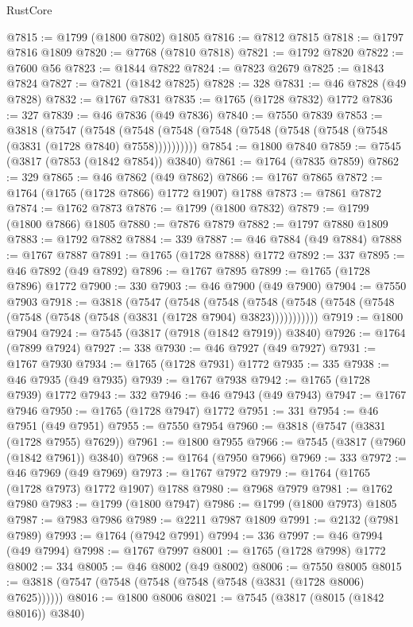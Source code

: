 \begin{lexlean}{RustCore}
\begin{coremodule}
@7815 := @1799 (@1800 @7802) @1805
@7816 := @7812 @7815
@7818 := @1797 @7816 @1809
@7820 := @7768 (@7810 @7818)
@7821 := @1792 @7820
@7822 := @7600 @56
@7823 := @1844 @7822
@7824 := @7823 @2679
@7825 := @1843 @7824
@7827 := @7821 (@1842 @7825)
@7828 := 328
@7831 := @46 @7828 (@49 @7828)
@7832 := @1767 @7831
@7835 := @1765 (@1728 @7832) @1772
@7836 := 327
@7839 := @46 @7836 (@49 @7836)
@7840 := @7550 @7839
@7853 := @3818
    (@7547
      (@7548 (@7548 (@7548 (@7548 (@7548 (@7548 (@7548 (@7548 (@3831 (@1728 @7840) @7558))))))))))
@7854 := @1800 @7840
@7859 := @7545 (@3817 (@7853 (@1842 @7854)) @3840)
@7861 := @1764 (@7835 @7859)
@7862 := 329
@7865 := @46 @7862 (@49 @7862)
@7866 := @1767 @7865
@7872 := @1764 (@1765 (@1728 @7866) @1772 @1907) @1788
@7873 := @7861 @7872
@7874 := @1762 @7873
@7876 := @1799 (@1800 @7832)
@7879 := @1799 (@1800 @7866) @1805
@7880 := @7876 @7879
@7882 := @1797 @7880 @1809
@7883 := @1792 @7882
@7884 := 339
@7887 := @46 @7884 (@49 @7884)
@7888 := @1767 @7887
@7891 := @1765 (@1728 @7888) @1772
@7892 := 337
@7895 := @46 @7892 (@49 @7892)
@7896 := @1767 @7895
@7899 := @1765 (@1728 @7896) @1772
@7900 := 330
@7903 := @46 @7900 (@49 @7900)
@7904 := @7550 @7903
@7918 := @3818
    (@7547
      (@7548
        (@7548
          (@7548 (@7548 (@7548 (@7548 (@7548 (@7548 (@7548 (@3831 (@1728 @7904) @3823)))))))))))
@7919 := @1800 @7904
@7924 := @7545 (@3817 (@7918 (@1842 @7919)) @3840)
@7926 := @1764 (@7899 @7924)
@7927 := 338
@7930 := @46 @7927 (@49 @7927)
@7931 := @1767 @7930
@7934 := @1765 (@1728 @7931) @1772
@7935 := 335
@7938 := @46 @7935 (@49 @7935)
@7939 := @1767 @7938
@7942 := @1765 (@1728 @7939) @1772
@7943 := 332
@7946 := @46 @7943 (@49 @7943)
@7947 := @1767 @7946
@7950 := @1765 (@1728 @7947) @1772
@7951 := 331
@7954 := @46 @7951 (@49 @7951)
@7955 := @7550 @7954
@7960 := @3818 (@7547 (@3831 (@1728 @7955) @7629))
@7961 := @1800 @7955
@7966 := @7545 (@3817 (@7960 (@1842 @7961)) @3840)
@7968 := @1764 (@7950 @7966)
@7969 := 333
@7972 := @46 @7969 (@49 @7969)
@7973 := @1767 @7972
@7979 := @1764 (@1765 (@1728 @7973) @1772 @1907) @1788
@7980 := @7968 @7979
@7981 := @1762 @7980
@7983 := @1799 (@1800 @7947)
@7986 := @1799 (@1800 @7973) @1805
@7987 := @7983 @7986
@7989 := @2211 @7987 @1809
@7991 := @2132 (@7981 @7989)
@7993 := @1764 (@7942 @7991)
@7994 := 336
@7997 := @46 @7994 (@49 @7994)
@7998 := @1767 @7997
@8001 := @1765 (@1728 @7998) @1772
@8002 := 334
@8005 := @46 @8002 (@49 @8002)
@8006 := @7550 @8005
@8015 := @3818 (@7547 (@7548 (@7548 (@7548 (@7548 (@3831 (@1728 @8006) @7625))))))
@8016 := @1800 @8006
@8021 := @7545 (@3817 (@8015 (@1842 @8016)) @3840)

\end{coremodule}
\end{lexlean}
